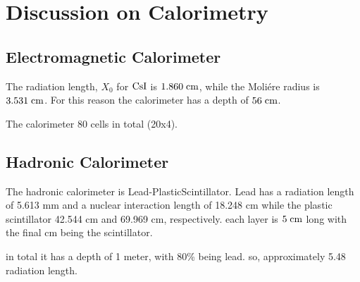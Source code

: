 \documentclass[a4paper,11pt,twoside]{article}
\begin{document}
\section{Discussion on Calorimetry}

\subsection{Electromagnetic Calorimeter}

The radiation length, $X_0$ for ${\rm CsI}$ is $1.860\;{\rm cm}$, while the Moli\'{e}re radius is $3.531\;{\rm cm}$.
For this reason the calorimeter has a depth of $56\;{\rm cm}$.

The calorimeter 80 cells in total (20x4).

\subsection{Hadronic Calorimeter}
The hadronic calorimeter is Lead-PlasticScintillator.
Lead has a radiation length of 5.613 mm and a nuclear interaction length of 18.248 cm
while the plastic scintillator 42.544 cm and 69.969 cm, respectively.
each layer is $5\;{\rm cm}$ long with the final cm being the scintillator.

in total it has a depth of 1 meter, with 80\% being lead. so, approximately 5.48 radiation length.
\end{document}
